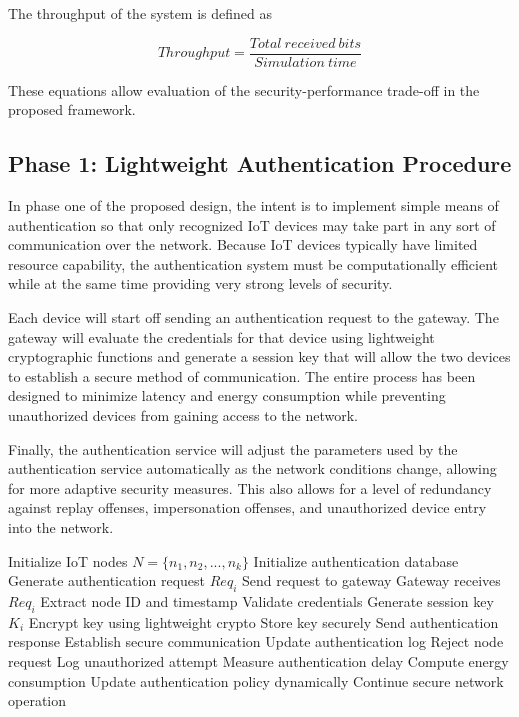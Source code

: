 \documentclass[a4paper,fleqn]{cas-dc}
\numberwithin{equation}{section}
\begin{document}
The throughput of the system is defined as

\begin{equation}
Throughput = \frac{Total\ received\ bits}{Simulation\ time}
\label{eq:throughput}
\end{equation}

These equations allow evaluation of the security-performance trade-off in the proposed framework.

\subsection{Phase 1: Lightweight Authentication Procedure}

In phase one of the proposed design, the intent is to implement simple means of authentication so that only recognized IoT devices may take part in any sort of communication over the network. Because IoT devices typically have limited resource capability, the authentication system must be computationally efficient while at the same time providing very strong levels of security.

Each device will start off sending an authentication request to the gateway. The gateway will evaluate the credentials for that device using lightweight cryptographic functions and generate a session key that will allow the two devices to establish a secure method of communication. The entire process has been designed to minimize latency and energy consumption while preventing unauthorized devices from gaining access to the network.

Finally, the authentication service will adjust the parameters used by the authentication service automatically as the network conditions change, allowing for more adaptive security measures. This also allows for a level of redundancy against replay offenses, impersonation offenses, and unauthorized device entry into the network.

\begin{algorithm}
\caption{Lightweight Authentication Algorithm}
\begin{algorithmic}[1]
\STATE Initialize IoT nodes $N = \{n_1, n_2, ..., n_k\}$
\STATE Initialize authentication database
    \STATE Generate authentication request $Req_i$
    \STATE Send request to gateway
    \STATE Gateway receives $Req_i$
    \STATE Extract node ID and timestamp
    \STATE Validate credentials
        \STATE Generate session key $K_i$
        \STATE Encrypt key using lightweight crypto
        \STATE Store key securely
        \STATE Send authentication response
        \STATE Establish secure communication
        \STATE Update authentication log
    \ELSE
        \STATE Reject node request
        \STATE Log unauthorized attempt
    \ENDIF
    \STATE Measure authentication delay
    \STATE Compute energy consumption
\ENDFOR
\STATE Update authentication policy dynamically
\STATE Continue secure network operation
\end{algorithmic}
\end{algorithm}
\end{document}
